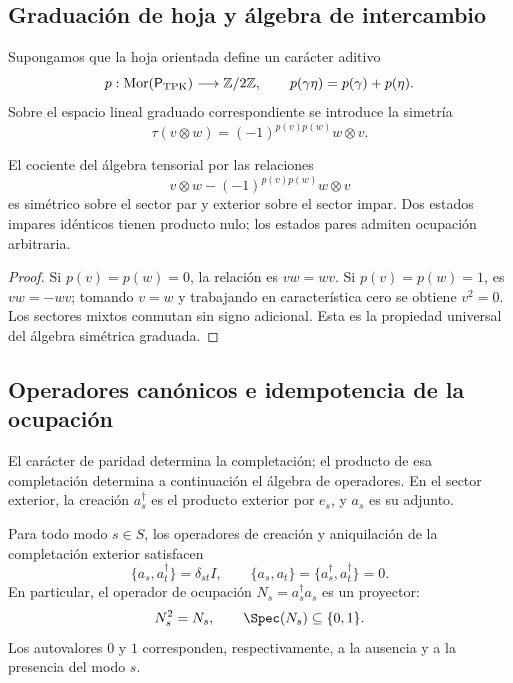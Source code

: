 \subsection{Graduación de hoja y álgebra de intercambio}
\label{v:rec:completaciones:section:04}

Supongamos que la hoja orientada define un carácter aditivo
\[
 p:\operatorname{Mor}(\mathsf P_{\rm TPK})\longrightarrow\mathbb Z/2\mathbb Z,
 \qquad p(\gamma\eta)=p(\gamma)+p(\eta).
\]
Sobre el espacio lineal graduado correspondiente se introduce la simetría
\[
 \tau(v\otimes w)=(-1)^{p(v)p(w)}w\otimes v.
\]

\begin{theorem}
\label{v:rec:completaciones:statement:02}
El cociente del álgebra tensorial por las relaciones
\[
 v\otimes w-(-1)^{p(v)p(w)}w\otimes v
\]
es simétrico sobre el sector par y exterior sobre el sector impar. Dos estados
impares idénticos tienen producto nulo; los estados pares admiten ocupación
arbitraria.
\end{theorem}

\begin{proof}
Si \(p(v)=p(w)=0\), la relación es \(vw=wv\). Si
\(p(v)=p(w)=1\), es \(vw=-wv\); tomando \(v=w\) y trabajando en
característica cero se obtiene \(v^2=0\). Los sectores mixtos conmutan sin
signo adicional. Esta es la propiedad universal del álgebra simétrica
graduada.
\end{proof}

\subsection{Operadores canónicos e idempotencia de la ocupación}
\label{v:pauli:car-construccion}

El carácter de paridad determina la completación; el producto de esa
completación determina a continuación el álgebra de operadores. En el
sector exterior, la creación \(a_s^\dagger\) es el producto exterior por
\(e_s\), y \(a_s\) es su adjunto.

\begin{theorem}
\label{v:rec:completaciones:statement:01}
\label{v:rec:thm:principio-exclusion-pauli}
Para todo modo \(s\in S\), los operadores de creación y aniquilación de la
completación exterior satisfacen
\begin{equation}
 \{a_s,a_t^\dagger\}=\delta_{st}I,
 \qquad
 \{a_s,a_t\}=\{a_s^\dagger,a_t^\dagger\}=0.
 \label{v:pauli:eq:car}
\end{equation}
En particular, el operador de ocupación
\(N_s=a_s^\dagger a_s\) es un proyector:
\begin{equation}
 N_s^2=N_s,
 \qquad \Spec(N_s)\subseteq\{0,1\}.
 \label{v:pauli:eq:proyeccion-ocupacion}
\end{equation}
Los autovalores \(0\) y \(1\) corresponden, respectivamente, a la ausencia
y a la presencia del modo \(s\).
\end{theorem}

